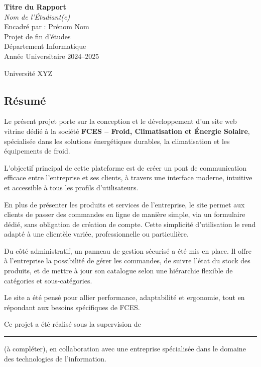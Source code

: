 \documentclass[12pt]{report}
\newcommand{\rqm}{\textquoteright}  %
\renewcommand\thesection{\arabic{section}}
\let\oldsection\section
\renewcommand{\section}[1]{%
  \refstepcounter{section}
  \addcontentsline{toc}{section}{Section~\thesection:~#1} %
  \clearpage
  \thispagestyle{fancy}
  \vspace*{0.4\textheight}
  \begin{center}
    \parbox{0.8\linewidth}{%
      \centering
      \setstretch{2.2} %
      {\color{maincolor}\fontsize{22pt}{24pt}\bfseries Section~\thesection:~#1}%
    }\\[0.7em]
    {\color{linecolor}\rule{0.8\linewidth}{1pt}} %
  \end{center}
  \vspace*{0.4\textheight}
}
\newcommand{\customtitlepage}{
    \begin{titlepage}
        \centering
        \vspace*{2cm}

        {\Huge\bfseries\color{maincolor}Titre du Rapport}\\[1.5cm]
        {\Large\itshape Nom de l'Étudiant(e)}\\
        {\large Encadré par : Prénom Nom}\\[2cm]

        {\large Projet de fin d’études}\\[0.5cm]
        {\large Département Informatique}\\
        {\large Année Universitaire 2024–2025}

        \vfill

        \vspace{0.5cm}
        {\large Université XYZ}

        \vfill
    \end{titlepage}
}
\begin{document}
\customtitlepage

\thispagestyle{fancy}
\setcounter{page}{1}

\begin{center}
\vspace*{\fill}

\oldsection*{\textcolor{maincolor}{Résumé}}
\justifying
\large

Le présent projet porte sur la conception et le développement d\rqm{}un site web vitrine dédié à la société \textbf{FCES – Froid, Climatisation et Énergie Solaire}, spécialisée dans les solutions énergétiques durables, la climatisation et les équipements de froid.

\vspace{1em}

L\rqm{}objectif principal de cette plateforme est de créer un pont de communication efficace entre l\rqm{}entreprise et ses clients, à travers une interface moderne, intuitive et accessible à tous les profils d\rqm{}utilisateurs.

\vspace{1em}

En plus de présenter les produits et services de l\rqm{}entreprise, le site permet aux clients de passer des commandes en ligne de manière simple, via un formulaire dédié, sans obligation de création de compte. Cette simplicité d\rqm{}utilisation le rend adapté à une clientèle variée, professionnelle ou particulière.

\vspace{1em}

Du côté administratif, un panneau de gestion sécurisé a été mis en place. Il offre à l\rqm{}entreprise la possibilité de gérer les commandes, de suivre l\rqm{}état du stock des produits, et de mettre à jour son catalogue selon une hiérarchie flexible de catégories et sous-catégories.

\vspace{1em}

Le site a été pensé pour allier performance, adaptabilité et ergonomie, tout en répondant aux besoins spécifiques de FCES.

\vspace{1em}

Ce projet a été réalisé sous la supervision de \rule{5cm}{0.4pt} (à compléter), en collaboration avec une entreprise spécialisée dans le domaine des technologies de l\rqm{}information.

\vspace*{\fill}
\end{center}
\end{document}
